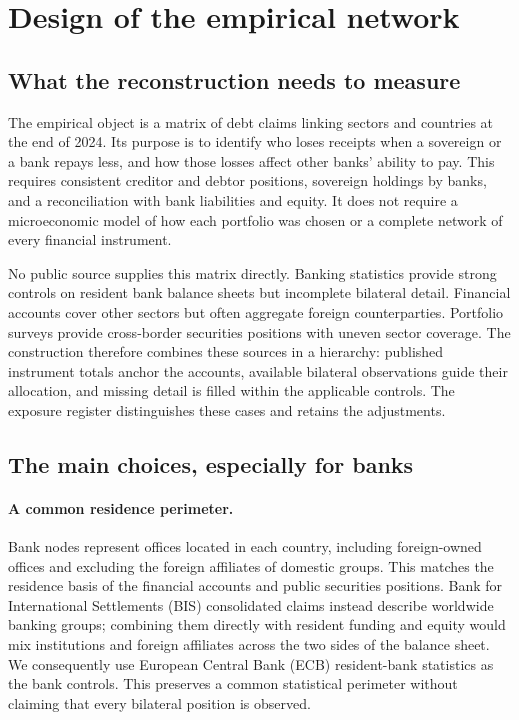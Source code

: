 \section{Design of the empirical network}\label{app:database-design}

\subsection{What the reconstruction needs to measure}

The empirical object is a matrix of debt claims linking sectors and countries at the end of 2024. Its purpose is to identify who loses receipts when a sovereign or a bank repays less, and how those losses affect other banks' ability to pay. This requires consistent creditor and debtor positions, sovereign holdings by banks, and a reconciliation with bank liabilities and equity. It does not require a microeconomic model of how each portfolio was chosen or a complete network of every financial instrument.

No public source supplies this matrix directly. Banking statistics provide strong controls on resident bank balance sheets but incomplete bilateral detail. Financial accounts cover other sectors but often aggregate foreign counterparties. Portfolio surveys provide cross-border securities positions with uneven sector coverage. The construction therefore combines these sources in a hierarchy: published instrument totals anchor the accounts, available bilateral observations guide their allocation, and missing detail is filled within the applicable controls. The exposure register distinguishes these cases and retains the adjustments.

\subsection{The main choices, especially for banks}

\paragraph{A common residence perimeter.}
Bank nodes represent offices located in each country, including foreign-owned offices and excluding the foreign affiliates of domestic groups. This matches the residence basis of the financial accounts and public securities positions. Bank for International Settlements (BIS) consolidated claims instead describe worldwide banking groups; combining them directly with resident funding and equity would mix institutions and foreign affiliates across the two sides of the balance sheet. We consequently use European Central Bank (ECB) resident-bank statistics as the bank controls. This preserves a common statistical perimeter without claiming that every bilateral position is observed.

